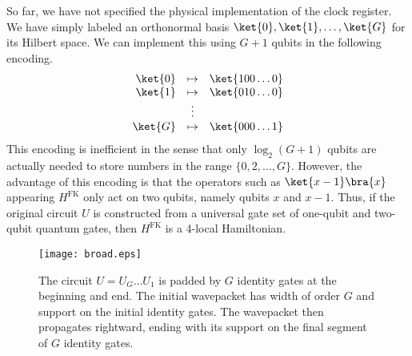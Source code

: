 \documentclass[11pt]{article}
\begin{document}
So far, we have not specified the physical implementation of the clock register. We have simply labeled an orthonormal basis $\ket{0}, \ket{1}, \ldots, \ket{G}$ for its Hilbert space. We can implement this using $G+1$ qubits in the following encoding.
\begin{equation}
\begin{array}{rcl}
\ket{0} & \mapsto & \ket{100\ldots0} \\
\ket{1} & \mapsto & \ket{010\ldots0} \\
        & \vdots  & \\
\ket{G} & \mapsto & \ket{000\ldots1} 
\end{array}
\label{pulseclock}
\end{equation}
This encoding is inefficient in the sense that only $\log_2 (G+1)$ qubits are actually needed to store numbers in the range $\{0,2,\ldots,G\}$. However, the advantage of this encoding is that the operators such as $\ket{x-1}\bra{x}$ appearing $H^{\mathrm{FK}}$ only act on two qubits, namely qubits $x$ and $x-1$. Thus, if the original circuit $U$ is constructed from a universal gate set of one-qubit and two-qubit quantum gates, then $H^{\mathrm{FK}}$ is a 4-local Hamiltonian.

\begin{figure}[htb]
\begin{center}
\texttt{[image: broad.eps]}
\caption{The circuit $U = U_G \ldots U_1$ is padded by $G$ identity gates at the beginning and end. The initial wavepacket has width of order $G$ and support on the initial identity gates. The wavepacket then propagates rightward, ending with its support on the final segment of $G$ identity gates.}
\label{fig:broad}
\end{center}
\end{figure}
\end{document}
